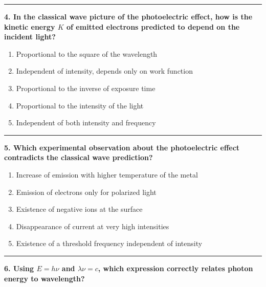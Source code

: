 \documentclass[
  english,
  9pt,
]{extbook}
\providecommand{\tightlist}{%
  \setlength{\itemsep}{0pt}\setlength{\parskip}{0pt}}
\theoremstyle{definition}
\theoremstyle{definition}
\theoremstyle{definition}
\theoremstyle{definition}
\theoremstyle{remark}
\begin{document}
\begin{center}\rule{0.5\linewidth}{0.5pt}\end{center}

\textbf{4. In the classical wave picture of the photoelectric effect, how is the kinetic energy \(K\) of emitted electrons predicted to depend on the incident light?}

\begin{enumerate}
\def\labelenumi{\alph{enumi}.}
\tightlist
\item
  Proportional to the square of the wavelength\\
\item
  Independent of intensity, depends only on work function\\
\item
  Proportional to the inverse of exposure time\\
\item
  Proportional to the intensity of the light\\
\item
  Independent of both intensity and frequency
\end{enumerate}

\begin{center}\rule{0.5\linewidth}{0.5pt}\end{center}

\textbf{5. Which experimental observation about the photoelectric effect contradicts the classical wave prediction?}

\begin{enumerate}
\def\labelenumi{\alph{enumi}.}
\tightlist
\item
  Increase of emission with higher temperature of the metal\\
\item
  Emission of electrons only for polarized light\\
\item
  Existence of negative ions at the surface\\
\item
  Disappearance of current at very high intensities\\
\item
  Existence of a threshold frequency independent of intensity
\end{enumerate}

\begin{center}\rule{0.5\linewidth}{0.5pt}\end{center}

\textbf{6. Using \(E = h\nu\) and \(\lambda \nu = c\), which expression correctly relates photon energy to wavelength?}
\end{document}
